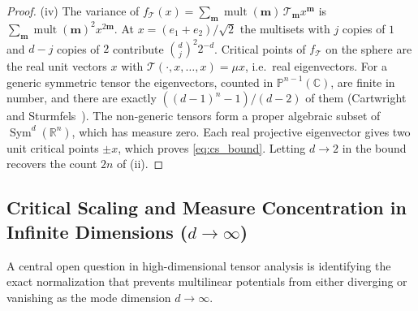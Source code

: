 \documentclass[11pt,a4paper,reqno]{amsart}
\theoremstyle{definition}
\numberwithin{equation}{section}
\providecommand{\R}{\mathbb{R}}
\newcommand{\C}{\mathbb{C}}
\begin{document}
\begin{proof}
(iv) The variance of $f_{\mathcal{T}}(x) = \sum_{\mathbf{m}} \operatorname{mult}(\mathbf{m})\, \mathcal{T}_{\mathbf{m}} x^{\mathbf{m}}$ is $\sum_{\mathbf{m}} \operatorname{mult}(\mathbf{m})^2 x^{2\mathbf{m}}$. At $x = (e_1+e_2)/\sqrt2$ the multisets with $j$ copies of $1$ and $d-j$ copies of $2$ contribute $\binom{d}{j}^2 2^{-d}$. Critical points of $f_{\mathcal{T}}$ on the sphere are the real unit vectors $x$ with $\mathcal{T}(\cdot, x, \dots, x) = \mu x$, i.e.\ real eigenvectors. For a generic symmetric tensor the eigenvectors, counted in $\mathbb{P}^{n-1}(\C)$, are finite in number, and there are exactly $((d-1)^n - 1)/(d-2)$ of them (Cartwright and Sturmfels~\cite{cartwright2013number}). The non-generic tensors form a proper algebraic subset of $\operatorname{Sym}^d(\R^n)$, which has measure zero. Each real projective eigenvector gives two unit critical points $\pm x$, which proves \eqref{eq:cs_bound}. Letting $d \to 2$ in the bound recovers the count $2n$ of (ii).
\end{proof}

\subsection{Critical Scaling and Measure Concentration in Infinite Dimensions (\texorpdfstring{$d \to \infty$}{d -> infty})}
\label{subsec:measure_concentration}

A central open question in high-dimensional tensor analysis is identifying the exact normalization that prevents multilinear potentials from either diverging or vanishing as the mode dimension $d \to \infty$.
\end{document}
